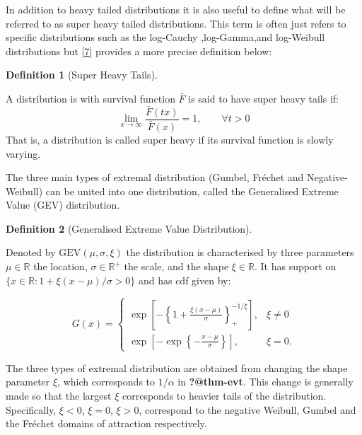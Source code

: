 \documentclass[
  10pt,
  a4paper,
]{scrreprt}
\theoremstyle{plain}
\theoremstyle{definition}
\newtheorem{definition}{Definition}[section]
\theoremstyle{plain}
\theoremstyle{remark}
\begin{document}
{In addition to heavy tailed distributions it is also useful to define
what will be referred to as super heavy tailed distributions. This term
is often just refers to specific distributions such as the log-Cauchy
,log-Gamma,and log-Weibull distributions but
{[}\protect\hyperlink{ref-fmh09}{7}{]} provides a more precise
definition below:

\begin{definition}[Super Heavy
Tails]\protect\hypertarget{def-sup}{}\label{def-sup}

A distribution is with survival function \(\bar F\) is said to have
super heavy tails if: \[
\lim_{x\rightarrow\infty}\displaystyle\frac{\bar F(tx)}{\bar F (x)} = 1,\qquad \forall t>0
\] That is, a distribution is called super heavy if its survival
function is slowly varying.

\end{definition}

The three main types of extremal distribution (Gumbel, Fréchet and
Negative-Weibull) can be united into one distribution, called the
Generalised Extreme Value (GEV) distribution.

\begin{definition}[Generalised Extreme Value
Distribution]\protect\hypertarget{def-gev}{}\label{def-gev}

Denoted by \(\text{GEV}(\mu,\sigma,\xi)\) the distribution is
characterised by three parameters \(\mu \in \mathbb R\) the location,
\(\sigma\in \mathbb R^+\) the scale, and the shape \(\xi\in \mathbb R\).
It has support on \(\{x\in \mathbb R:1+\xi(x-\mu)/\sigma > 0\}\) and has
cdf given by:

\[
G(x) = \begin{cases}\exp\left[-\left\{1+\displaystyle\frac{\xi(x-\mu)}{\sigma}\right\}_+^{-1/\xi}\right],&\xi\ne0\\
\exp\left[-\exp\left\{-\displaystyle\frac{x-\mu}{\sigma}\right\}\right],&\xi=0.
\end{cases}
\]

\end{definition}

The three types of extremal distribution are obtained from changing the
shape parameter \(\xi\), which corresponds to \(1/\alpha\) in
\textbf{?@thm-evt}. This change is generally made so that the largest
\(\xi\) corresponds to heavier tails of the distribution. Specifically,
\(\xi<0\), \(\xi=0\), \(\xi>0\), correspond to the negative Weibull,
Gumbel and the Fréchet domains of attraction respectively.

}
\end{document}
